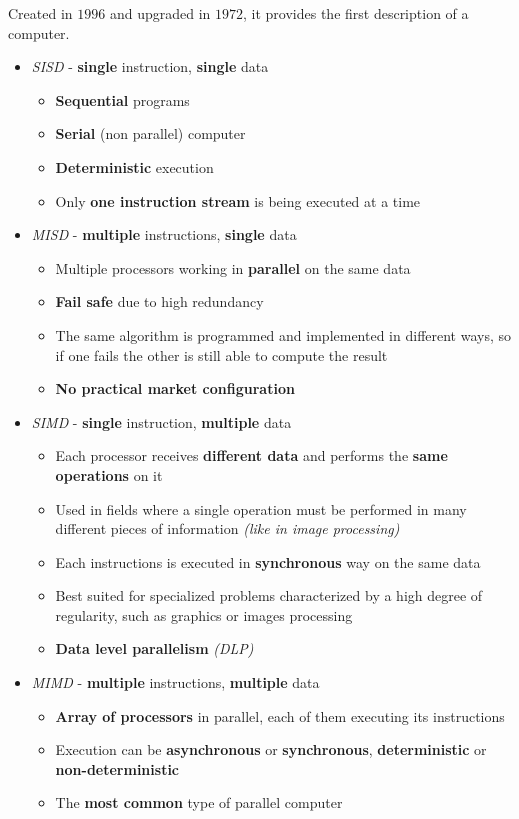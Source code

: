 \documentclass[english]{article}
\begin{document}
Created in \(1996\) and upgraded in \(1972\), it provides the first description of a computer.

\begin{itemize}
  \item \textit{SISD} - \textbf{single} instruction, \textbf{single} data
        \begin{itemize}
          \item \textbf{Sequential} programs
          \item \textbf{Serial} (non parallel) computer
          \item \textbf{Deterministic} execution
          \item Only \textbf{one instruction stream} is being executed at a time
        \end{itemize}
  \item \textit{MISD} - \textbf{multiple} instructions, \textbf{single} data
        \begin{itemize}
          \item Multiple processors working in \textbf{parallel} on the same data
          \item \textbf{Fail safe} due to high redundancy
          \item The same algorithm is programmed and implemented in different ways, so if one fails the other is still able to compute the result
          \item \textbf{No practical market configuration}
        \end{itemize}
  \item \textit{SIMD} - \textbf{single} instruction, \textbf{multiple} data
        \begin{itemize}
          \item Each processor receives \textbf{different data} and performs the \textbf{same operations} on it
          \item Used in fields where a single operation must be performed in many different pieces of information \textit{(like in image processing)}
          \item Each instructions is executed in \textbf{synchronous} way on the same data
          \item Best suited for specialized problems characterized by a high degree of regularity, such as graphics or images processing
          \item \textbf{Data level parallelism} \textit{(DLP)}
        \end{itemize}
  \item \textit{MIMD} - \textbf{multiple} instructions, \textbf{multiple} data
        \begin{itemize}
          \item \textbf{Array of processors} in parallel, each of them executing its instructions
          \item Execution can be \textbf{asynchronous} or \textbf{synchronous}, \textbf{deterministic} or \textbf{non-deterministic}
          \item The \textbf{most common} type of parallel computer
        \end{itemize}
\end{itemize}
\end{document}
